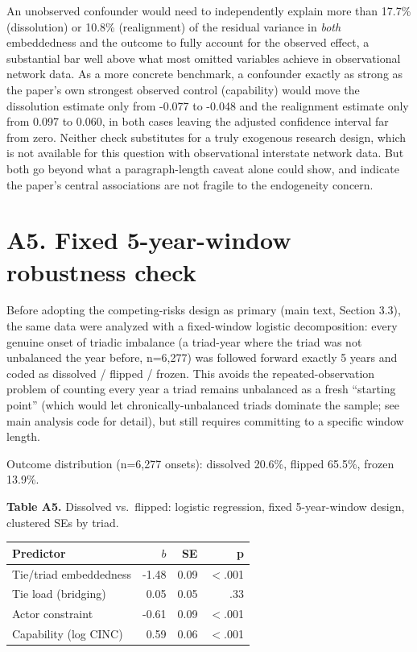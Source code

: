 \documentclass[Afour,sageh,times,doublespace]{sagej}
\begin{document}
An unobserved confounder would need to independently explain more than 17.7\% (dissolution) or 10.8\% (realignment) of the residual variance in \emph{both} embeddedness and the outcome to fully account for the observed effect, a substantial bar well above what most omitted variables achieve in observational network data. As a more concrete benchmark, a confounder exactly as strong as the paper's own strongest observed control (capability) would move the dissolution estimate only from -0.077 to -0.048 and the realignment estimate only from 0.097 to 0.060, in both cases leaving the adjusted confidence interval far from zero. Neither check substitutes for a truly exogenous research design, which is not available for this question with observational interstate network data. But both go beyond what a paragraph-length caveat alone could show, and indicate the paper's central associations are not fragile to the endogeneity concern.

\section*{A5. Fixed 5-year-window robustness check}

Before adopting the competing-risks design as primary (main text, Section 3.3), the same data were analyzed with a fixed-window logistic decomposition: every genuine onset of triadic imbalance (a triad-year where the triad was not unbalanced the year before, n=6,277) was followed forward exactly 5 years and coded as dissolved / flipped / frozen. This avoids the repeated-observation problem of counting every year a triad remains unbalanced as a fresh ``starting point'' (which would let chronically-unbalanced triads dominate the sample; see main analysis code for detail), but still requires committing to a specific window length.

Outcome distribution (n=6,277 onsets): dissolved 20.6\%, flipped 65.5\%, frozen 13.9\%.

\begin{table}[t]
\centering
\textbf{Table A5.} Dissolved vs.\ flipped: logistic regression, fixed 5-year-window design, clustered SEs by triad.

\vspace{4pt}
{\small\sf
\begin{tabular}{lrrr}
\toprule
Predictor & $b$ & SE & p\\
\midrule
Tie/triad embeddedness & -1.48 & 0.09 & $<$.001\\
Tie load (bridging) & 0.05 & 0.05 & .33\\
Actor constraint & -0.61 & 0.09 & $<$.001\\
Capability (log CINC) & 0.59 & 0.06 & $<$.001\\
\bottomrule
\end{tabular}
\par}
\end{table}
\end{document}
